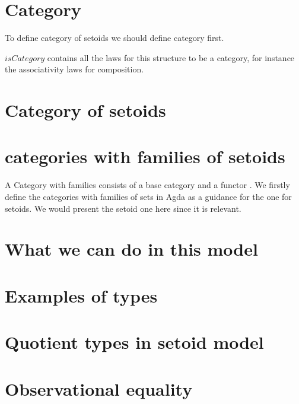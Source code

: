 \section{Category}

To define category of setoids we should define category first.



$isCategory$ contains all the laws for this structure to be a category, for instance the
associativity laws for composition.

\section{Category of setoids}





\section{categories with families of setoids}


A Category with families consists of a base category and a functor
\cite{clairambault2005categories}. We firstly define the categories with
families of sets in Agda  as a guidance for the one for setoids. We
would present the setoid one here since it is relevant.



\section{What we can do in this model}

\section{Examples of types}









\section{Quotient types in setoid model}





\section{Observational equality}

